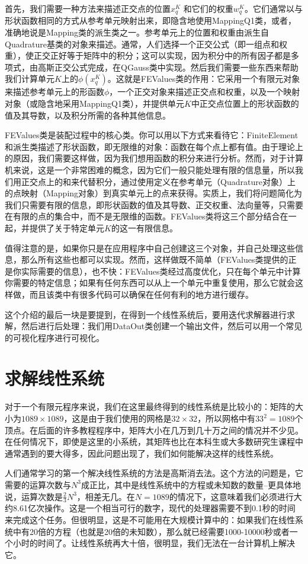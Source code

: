 \documentclass[nofonts]{ctexart} %
\begin{document}
    首先，我们需要一种方法来描述正交点的位置$x_q^K$
和它们的权重$w_q^K$。它们通常以与形状函数相同的方式从参考单元映射出来，即隐含地使用MappingQ1类，或者，准确地说是Mapping类的派生类之一。参考单元上的位置和权重由派生自Quadrature基类的对象来描述。通常，人们选择一个正交公式（即一组点和权重），使正交正好等于矩阵中的积分；这可以实现，因为积分中的所有因子都是多项式，由高斯正交公式完成，在QGauss类中实现。然后我们需要一些东西来帮助我们计算单元$K$上的$\phi(x_q^K)$。这就是FEValues类的作用：它采用一个有限元对象来描述参考单元上的形函数$\phi$，一个正交对象来描述正交点和权重，以及一个映射对象（或隐含地采用MappingQ1类），并提供单元$K$中正交点位置上的形状函数的值及其导数，以及积分所需的各种其他信息。

FEValues类是装配过程中的核心类。你可以用以下方式来看待它：FiniteElement和派生类描述了形状函数，即无限维的对象：函数在每个点上都有值。由于理论上的原因，我们需要这样做，因为我们想用函数的积分来进行分析。然而，对于计算机来说，这是一个非常困难的概念，因为它们一般只能处理有限的信息量，所以我们用正交点上的和来代替积分，通过使用定义在参考单元（Quadrature对象）上的点映射（Mapping对象）到真实单元上的点来获得。实质上，我们将问题简化为我们只需要有限的信息，即形状函数的值及其导数、正交权重、法向量等，只需要在有限的点的集合中，而不是无限维的函数。FEValues类将这三个部分结合在一起，并提供了关于特定单元$K$的这一有限信息。

值得注意的是，如果你只是在应用程序中自己创建这三个对象，并自己处理这些信息，那么所有这些也都可以实现。然而，这样做既不简单（FEValues类提供的正是你实际需要的信息），也不快：FEValues类经过高度优化，只在每个单元中计算你需要的特定信息；如果有任何东西可以从上一个单元中重复使用，那么它就会这样做，而且该类中有很多代码可以确保在任何有利的地方进行缓存。

这个介绍的最后一块是要提到，在得到一个线性系统后，要用迭代求解器进行求解，然后进行后处理：我们用DataOut类创建一个输出文件，然后可以用一个常见的可视化程序进行可视化。 
\section{求解线性系统}
对于一个有限元程序来说，我们在这里最终得到的线性系统是比较小的：矩阵的大小为$1089 \times 1089$，这是由于我们使用的网格是$32 \times 32$，所以网格中有$33^2=1089$个顶点。在后面的许多教程程序中，矩阵大小在几万到几十万之间的情况并不少见。在任何情况下，即使是这里的小系统，其矩阵也比在本科生或大多数研究生课程中通常遇到的要大得多，因此问题出现了，我们如何能解决这样的线性系统。

人们通常学习的第一个解决线性系统的方法是高斯消去法。这个方法的问题是，它需要的运算次数与$N^3$成正比，其中是线性系统中的方程或未知数的数量--更具体地说，运算次数是$\frac{2}{3}N^3$，相差无几。在$N=1089$的情况下，这意味着我们必须进行大约8.61亿次操作。这是一个相当可行的数字，现代的处理器需要不到0.1秒的时间来完成这个任务。但很明显，这是不可能用在大规模计算中的：如果我们在线性系统中有20倍的方程（也就是20倍的未知数），那么就已经需要1000-10000秒或者一个小时的时间了。让线性系统再大十倍，很明显，我们无法在一台计算机上解决它。
\end{document}
